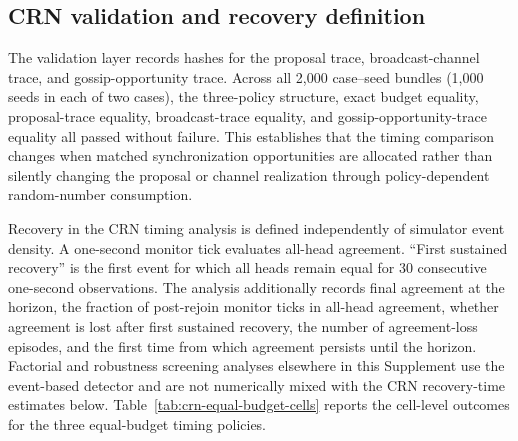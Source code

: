 \documentclass[11pt]{article}
\begin{document}
\subsection{CRN validation and recovery definition}
The validation layer records hashes for the proposal trace, broadcast-channel trace, and gossip-opportunity trace. Across all 2,000 case--seed bundles (1,000 seeds in each of two cases), the three-policy structure, exact budget equality, proposal-trace equality, broadcast-trace equality, and gossip-opportunity-trace equality all passed without failure. This establishes that the timing comparison changes when matched synchronization opportunities are allocated rather than silently changing the proposal or channel realization through policy-dependent random-number consumption.

Recovery in the CRN timing analysis is defined independently of simulator event density. A one-second monitor tick evaluates all-head agreement. ``First sustained recovery'' is the first event for which all heads remain equal for 30 consecutive one-second observations. The analysis additionally records final agreement at the horizon, the fraction of post-rejoin monitor ticks in all-head agreement, whether agreement is lost after first sustained recovery, the number of agreement-loss episodes, and the first time from which agreement persists until the horizon. Factorial and robustness screening analyses elsewhere in this Supplement use the event-based detector and are not numerically mixed with the CRN recovery-time estimates below. Table~\ref{tab:crn-equal-budget-cells} reports the cell-level outcomes for the three equal-budget timing policies.

\begin{table}[H]
\centering
\caption{Cell statistics for the CRN equal-budget timing experiment (1,000 matched seeds per case; Full head rule). Assigned budget is the pre-drop policy counter and is exactly equal across the three policies within every seed.}
\label{tab:crn-equal-budget-cells}
\scriptsize
{}
\end{table}
\end{document}
